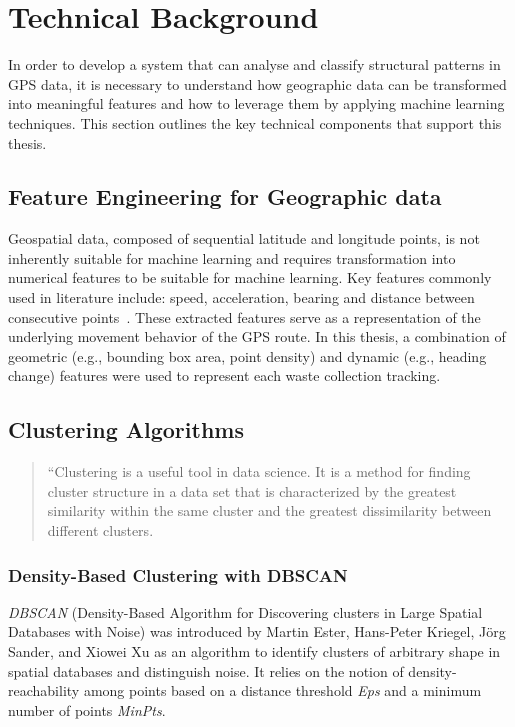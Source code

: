 \documentclass[a4paper,12pt,twoside]{scrreprt}
\begin{document}
\section{Technical Background}
In order to develop a system that can analyse and classify structural patterns
in GPS data, it is necessary to understand how geographic data can be
transformed into meaningful features and how to leverage them by applying
machine learning techniques.
This section outlines the key technical components that support this thesis.

\subsection{Feature Engineering for Geographic data}
Geospatial data, composed of sequential latitude and longitude points,
is not inherently suitable for machine learning and requires transformation
into numerical features to be suitable for machine learning.
Key features commonly used in literature include: speed, acceleration, bearing
and distance between consecutive points~\cite{etemad_predicting_2018}.
These extracted features serve as a representation of the underlying movement
behavior of the GPS route.
In this thesis, a combination of geometric (e.g., bounding box area, point
density) and dynamic (e.g., heading change) features were used to represent
each waste collection tracking.

\subsection{Clustering Algorithms}
\begin{quote}
  ``Clustering is a useful tool in data science. It is a method for
  finding cluster structure in a data set that is characterized by
  the greatest similarity within the same cluster and the
  greatest dissimilarity between different
  clusters.~\cite{sinaga_pdf_2024}
\end{quote}

\subsubsection{Density-Based Clustering with DBSCAN}

\textit{DBSCAN} (Density-Based Algorithm for Discovering clusters in Large
Spatial Databases with Noise) was
introduced by Martin Ester, Hans-Peter Kriegel, Jörg Sander, and Xiowei Xu as
an algorithm to
identify
clusters of arbitrary shape in spatial databases and distinguish noise. It
relies on the notion of density-reachability among points based on a distance
threshold \textit{Eps} and a minimum number of points
\textit{MinPts}.~\cite{ester_density-based_nodate}
\end{document}
